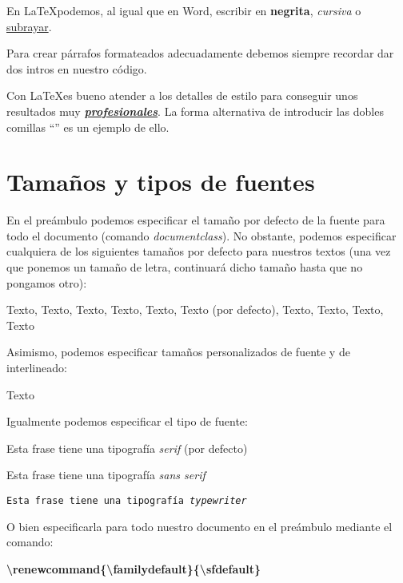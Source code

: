 \documentclass[12pt]{book} %
\begin{document}
En \LaTeX podemos,  al igual que en Word, escribir en \textbf{negrita}, \emph{cursiva} o \underline{subrayar}.

Para crear párrafos formateados adecuadamente debemos siempre recordar dar dos intros en nuestro código.

Con \LaTeX es bueno atender a los detalles de estilo para conseguir unos resultados muy \textbf{\underline{\emph{profesionales}}}. La forma alternativa de introducir las dobles comillas ``'' es un ejemplo de ello.

\section{Tamaños y tipos de fuentes}

En el preámbulo podemos especificar el tamaño por defecto de la fuente para todo el documento (comando \emph{documentclass}). No obstante, podemos especificar cualquiera de los siguientes tamaños por defecto para nuestros textos (una vez que ponemos un tamaño de letra, continuará dicho tamaño hasta que no pongamos otro):

\Huge Texto, \huge  Texto, \LARGE Texto, \Large Texto, \large Texto, \normalsize Texto (por defecto), \small Texto, \footnotesize Texto, \scriptsize Texto, \tiny Texto

\normalsize %

Asimismo, podemos especificar tamaños personalizados de fuente y de interlineado:

\fontsize{22pt}{1cm}\selectfont Texto

\normalsize %

Igualmente podemos especificar el tipo de fuente: 

\textrm{Esta frase tiene una tipografía \emph{serif} (por defecto)}

\textsf{Esta frase tiene una tipografía \emph{sans serif}}

\texttt{Esta frase tiene una tipografía \emph{typewriter}}

O bien especificarla para todo nuestro documento en el preámbulo mediante el comando: %

\textbf{\textbackslash renewcommand\{\textbackslash familydefault\}\{\textbackslash sfdefault\}}
\end{document}
